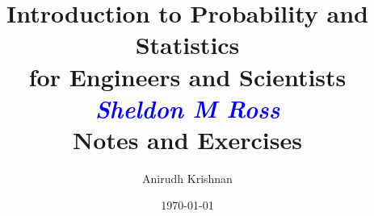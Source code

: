\documentclass[letterpaper,12pt]{report}
\begin{document}
\author{Anirudh Krishnan}
\title{Introduction to Probability and Statistics \\ for Engineers and Scientists \\ \textit{\textcolor{blue}{Sheldon M Ross}} \\ Notes and Exercises}
\date{\today}

\maketitle
\tableofcontents

%
%
%
%
%
%
%
%


\end{document}
